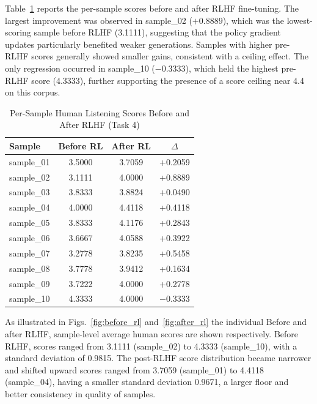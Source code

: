 \documentclass[conference]{IEEEtran}
\begin{document}
Table~\ref{tab:rlhf_persample} reports the per-sample scores before and after
RLHF fine-tuning. The largest improvement was observed in sample\_02
($+0.8889$), which was the lowest-scoring sample before RLHF (3.1111),
suggesting that the policy gradient updates particularly benefited weaker
generations. Samples with higher pre-RLHF scores generally showed smaller
gains, consistent with a ceiling effect. The only regression occurred in
sample\_10 ($-0.3333$), which held the highest pre-RLHF score (4.3333),
further supporting the presence of a score ceiling near 4.4 on this corpus.

\begin{table}[htbp]
\caption{Per-Sample Human Listening Scores Before and After RLHF (Task 4)}
\begin{center}
\begin{tabular}{|l|c|c|c|}
\hline
\textbf{Sample} & \textbf{Before RL} & \textbf{After RL} & \textbf{$\Delta$} \\
\hline
sample\_01 & 3.5000 & 3.7059 & +0.2059 \\
sample\_02 & 3.1111 & 4.0000 & +0.8889 \\
sample\_03 & 3.8333 & 3.8824 & +0.0490 \\
sample\_04 & 4.0000 & 4.4118 & +0.4118 \\
sample\_05 & 3.8333 & 4.1176 & +0.2843 \\
sample\_06 & 3.6667 & 4.0588 & +0.3922 \\
sample\_07 & 3.2778 & 3.8235 & +0.5458 \\
sample\_08 & 3.7778 & 3.9412 & +0.1634 \\
sample\_09 & 3.7222 & 4.0000 & +0.2778 \\
sample\_10 & 4.3333 & 4.0000 & $-$0.3333 \\
\hline
\end{tabular}
\label{tab:rlhf_persample}
\end{center}
\end{table}

As illustrated in Figs.~\ref{fig:before_rl} and~\ref{fig:after_rl} the individual
Before and after RLHF, sample-level average human scores are shown respectively. Before
RLHF, scores ranged from 3.1111 (sample\_02) to 4.3333 (sample\_10), with a
standard deviation of 0.9815. The post-RLHF score distribution became narrower and
shifted upward scores ranged from 3.7059 (sample\_01) to 4.4118 (sample\_04),
having a smaller standard deviation 0.9671, a larger floor and
better consistency in quality of samples.
\end{document}
